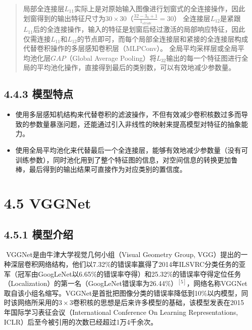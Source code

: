 \begin{quote}
局部全连接层\(L_{11}\)实际上是对原始输入图像进行划窗式的全连接操作，因此划窗得到的输出特征尺寸为\(30\times30\)（\(\frac{32-3_k+1}{1_{stride}}=30\)）
全连接层\(L_{12}\)是紧跟\(L_{11}\)后的全连接操作，输入的特征是划窗后经过激活的局部响应特征，因此仅需连接\(L_{11}\)和\(L_{12}\)的节点即可，而每个局部全连接层和紧接的全连接层构成代替卷积操作的多层感知卷积层（MLPConv）。
全局平均采样层或全局平均池化层\(GAP\)（Global Average
Pooling）将\(L_{32}\)输出的每一个特征图进行全局的平均池化操作，直接得到最后的类别数，可以有效地减少参数量。
\end{quote}

\subsection{4.4.3 模型特点}\label{ux6a21ux578bux7279ux70b9}

\begin{itemize}
\item
  使用多层感知机结构来代替卷积的滤波操作，不但有效减少卷积核数过多而导致的参数量暴涨问题，还能通过引入非线性的映射来提高模型对特征的抽象能力。
\item
  使用全局平均池化来代替最后一个全连接层，能够有效地减少参数量（没有可训练参数），同时池化用到了整个特征图的信息，对空间信息的转换更加鲁棒，最后得到的输出结果可直接作为对应类别的置信度。
\end{itemize}

\section{4.5 VGGNet}\label{vggnet}

\subsection{4.5.1 模型介绍}\label{ux6a21ux578bux4ecbux7ecd-4}

​ VGGNet是由牛津大学视觉几何小组（Visual Geometry Group,
VGG）提出的一种深层卷积网络结构，他们以7.32\%的错误率赢得了2014年ILSVRC分类任务的亚军（冠军由GoogLeNet以6.65\%的错误率夺得）和25.32\%的错误率夺得定位任务（Localization）的第一名（GoogLeNet错误率为26.44\%）\(^{[5]}\)，网络名称VGGNet取自该小组名缩写。VGGNet是首批把图像分类的错误率降低到10\%以内模型，同时该网络所采用的\(3\times3\)卷积核的思想是后来许多模型的基础，该模型发表在2015年国际学习表征会议（International
Conference On Learning Representations,
ICLR）后至今被引用的次数已经超过1万4千余次。

